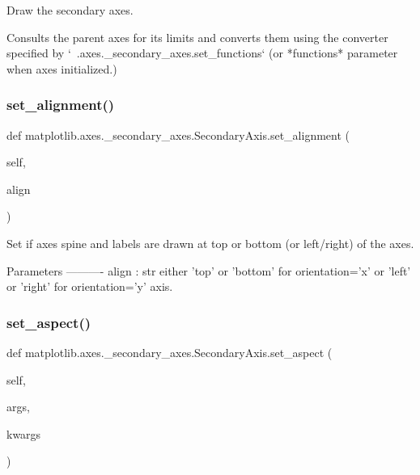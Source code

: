 \begin{DoxyVerb}Draw the secondary axes.

Consults the parent axes for its limits and converts them
using the converter specified by
`~.axes._secondary_axes.set_functions` (or *functions*
parameter when axes initialized.)
\end{DoxyVerb}
 \mbox{\label{classmatplotlib_1_1axes_1_1__secondary__axes_1_1SecondaryAxis_a65fc47bd8e119a98811d1136b9d13448}} 
\subsubsection{\texorpdfstring{set\+\_\+alignment()}{set\_alignment()}}
{\footnotesize\ttfamily def matplotlib.\+axes.\+\_\+secondary\+\_\+axes.\+Secondary\+Axis.\+set\+\_\+alignment (\begin{DoxyParamCaption}\item[{}]{self,  }\item[{}]{align }\end{DoxyParamCaption})}

\begin{DoxyVerb}Set if axes spine and labels are drawn at top or bottom (or left/right)
of the axes.

Parameters
----------
align : str
    either 'top' or 'bottom' for orientation='x' or
    'left' or 'right' for orientation='y' axis.
\end{DoxyVerb}
 \mbox{\label{classmatplotlib_1_1axes_1_1__secondary__axes_1_1SecondaryAxis_a11570e1c4601785a4629fc696cf0c0d5}} 
\subsubsection{\texorpdfstring{set\+\_\+aspect()}{set\_aspect()}}
{\footnotesize\ttfamily def matplotlib.\+axes.\+\_\+secondary\+\_\+axes.\+Secondary\+Axis.\+set\+\_\+aspect (\begin{DoxyParamCaption}\item[{}]{self,  }\item[{}]{args,  }\item[{}]{kwargs }\end{DoxyParamCaption})}

